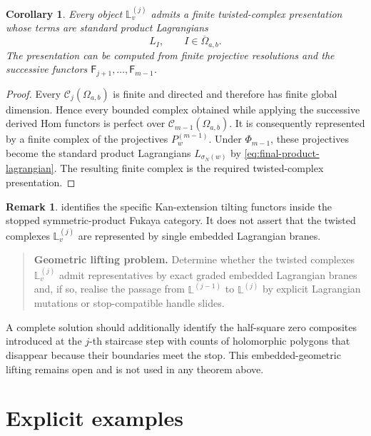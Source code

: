 \documentclass[12pt,a4paper,english,reqno]{amsart}
\theoremstyle{plain}
\newtheorem{corollary}[theorem]{Corollary}
\theoremstyle{definition}
\newtheorem{remark}[theorem]{Remark}
\newcommand{\C}{\mathcal C}
\begin{document}
\begin{corollary}
\label{cor:twisted-complex-staircase}
Every object $\mathbb L_v^{(j)}$ admits a finite twisted-complex
presentation whose terms are standard product Lagrangians
\[
 L_I,\qquad I\in\overline\Omega_{a,b}.
\]
The presentation can be computed from finite projective resolutions and the
successive functors $\mathsf F_{j+1},\ldots,\mathsf F_{m-1}$.
\end{corollary}

\begin{proof}
Every $\C_j(\Omega_{a,b})$ is finite and directed and therefore has finite
global dimension.  Hence every bounded complex obtained while applying the
successive derived Hom functors is perfect over
$\C_{m-1}(\Omega_{a,b})$.  It is consequently represented by a finite
complex of the projectives $P_w^{(m-1)}$.  Under $\Phi_{m-1}$, these
projectives become the standard product Lagrangians
$L_{\sigma_N(w)}$ by \eqref{eq:final-product-lagrangian}.  The resulting
finite complex is the required twisted-complex presentation.
\end{proof}

\begin{remark}
\label{rem:categorical-versus-geometric}
 identifies the specific
Kan-extension tilting functors inside the stopped symmetric-product Fukaya
category.  It does not assert that the twisted complexes
$\mathbb L_v^{(j)}$ are represented by single embedded Lagrangian branes.
\end{remark}

\begin{quote}
\textbf{Geometric lifting problem.}
Determine whether the twisted complexes
$\mathbb L_v^{(j)}$ admit representatives by exact graded embedded
Lagrangian branes and, if so, realise the passage from
$\mathbb L^{(j-1)}$ to $\mathbb L^{(j)}$ by explicit Lagrangian
mutations or stop-compatible handle slides.
\end{quote}

A complete solution should additionally identify the half-square zero
composites introduced at the $j$-th staircase step with counts of
holomorphic polygons that disappear because their boundaries meet the stop.
This embedded-geometric lifting remains open and is not used in any theorem
above.


\section{Explicit examples}
\label{sec:examples}
\end{document}
